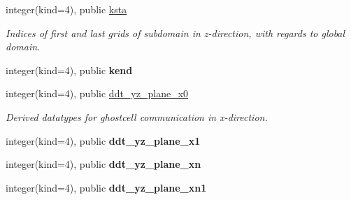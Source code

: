 \textbf{ }\par
\begin{DoxyCompactItemize}
\item 
\mbox{\label{structgeometry_1_1subdomain_ac83bbafe91c89c9d7c4be7df88cc3f72}} 
integer(kind=4), public \hyperlink{structgeometry_1_1subdomain_ac83bbafe91c89c9d7c4be7df88cc3f72}{ksta}
\begin{DoxyCompactList}\small\item\em Indices of first and last grids of subdomain in z-\/direction, with regards to global domain. \end{DoxyCompactList}\item 
\mbox{\label{structgeometry_1_1subdomain_a0e622a4e26eeb8b17fdf300e4d900ffb}} 
integer(kind=4), public {\bfseries kend}
\end{DoxyCompactItemize}

\textbf{ }\par
\begin{DoxyCompactItemize}
\item 
\mbox{\label{structgeometry_1_1subdomain_a47600c2cb2df3aa446b4eac99aa19dfa}} 
integer(kind=4), public \hyperlink{structgeometry_1_1subdomain_a47600c2cb2df3aa446b4eac99aa19dfa}{ddt\+\_\+yz\+\_\+plane\+\_\+x0}
\begin{DoxyCompactList}\small\item\em Derived datatypes for ghostcell communication in x-\/direction. \end{DoxyCompactList}\item 
\mbox{\label{structgeometry_1_1subdomain_a36c015128564011d09b03d9d238782e3}} 
integer(kind=4), public {\bfseries ddt\+\_\+yz\+\_\+plane\+\_\+x1}
\item 
\mbox{\label{structgeometry_1_1subdomain_aeddeabddc20c73b5190e44c316968222}} 
integer(kind=4), public {\bfseries ddt\+\_\+yz\+\_\+plane\+\_\+xn}
\item 
\mbox{\label{structgeometry_1_1subdomain_a98a8b88468c10ddeb72b0e24d9912c95}} 
integer(kind=4), public {\bfseries ddt\+\_\+yz\+\_\+plane\+\_\+xn1}
\end{DoxyCompactItemize}

